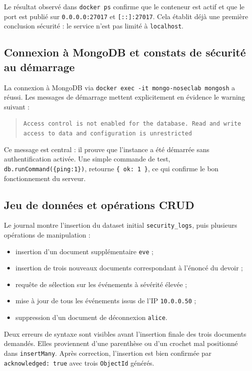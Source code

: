 \documentclass[11pt,a4paper]{article}
\begin{document}
Le résultat observé dans \texttt{docker ps} confirme que le conteneur est actif et que le port est publié sur \texttt{0.0.0.0:27017} et \texttt{[::]:27017}. Cela établit déjà une première conclusion sécurité : le service n'est pas limité à \texttt{localhost}.

\subsection{Connexion à MongoDB et constats de sécurité au démarrage}

La connexion à MongoDB via \texttt{docker exec -it mongo-noseclab mongosh} a réussi. Les messages de démarrage mettent explicitement en évidence le warning suivant :

\begin{quote}
\texttt{Access control is not enabled for the database. Read and write access to data and configuration is unrestricted}
\end{quote}

Ce message est central : il prouve que l'instance a été démarrée sans authentification activée. Une simple commande de test, \texttt{db.runCommand(\{ping:1\})}, retourne \texttt{\{ ok: 1 \}}, ce qui confirme le bon fonctionnement du serveur.

\subsection{Jeu de données et opérations CRUD}

Le journal montre l'insertion du dataset initial \texttt{security\_logs}, puis plusieurs opérations de manipulation :

\begin{itemize}
  \item insertion d'un document supplémentaire \texttt{eve} ;
  \item insertion de trois nouveaux documents correspondant à l'énoncé du devoir ;
  \item requête de sélection sur les événements à sévérité élevée ;
  \item mise à jour de tous les événements issus de l'IP \texttt{10.0.0.50} ;
  \item suppression d'un document de déconnexion \texttt{alice}.
\end{itemize}

Deux erreurs de syntaxe sont visibles avant l'insertion finale des trois documents demandés. Elles proviennent d'une parenthèse ou d'un crochet mal positionné dans \texttt{insertMany}. Après correction, l'insertion est bien confirmée par \texttt{acknowledged: true} avec trois \texttt{ObjectId} générés.
\end{document}
